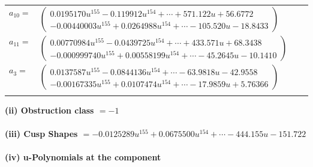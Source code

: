 \documentclass[1p]{elsarticle_modified}
\theoremstyle{definition}
\begin{document}
\begin{tabular}{m{7pt} m{180pt} m{7pt} m{180pt} }
\flushright $a_{10}=$&$\begin{pmatrix}0.0195170 u^{155}-0.119912 u^{154}+\cdots+571.122 u+56.6772\\-0.00440003 u^{155}+0.0264988 u^{154}+\cdots-105.520 u-18.8433\end{pmatrix}$ \\
\flushright $a_{11}=$&$\begin{pmatrix}0.00770984 u^{155}-0.0439725 u^{154}+\cdots+433.571 u+68.3438\\-0.000999740 u^{155}+0.00558199 u^{154}+\cdots-45.2645 u-10.1410\end{pmatrix}$ \\
\flushright $a_{3}=$&$\begin{pmatrix}0.0137587 u^{155}-0.0844136 u^{154}+\cdots-63.9818 u-42.9558\\-0.00167335 u^{155}+0.0107474 u^{154}+\cdots-17.9859 u+5.76366\end{pmatrix}$\\&\end{tabular}
\flushleft \textbf{(ii) Obstruction class $= -1$}\\~\\
\flushleft \textbf{(iii) Cusp Shapes $= -0.0125289 u^{155}+0.0675500 u^{154}+\cdots-444.155 u-151.722$}\\~\\
\newpage\renewcommand{\arraystretch}{1}
\flushleft \textbf{(iv) u-Polynomials at the component}\newline \\
\end{document}

